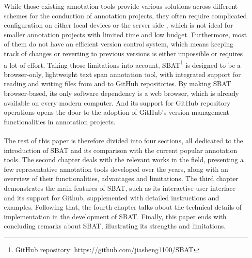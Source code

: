 \documentclass[12ptm a4paper]{article}
\begin{document}
While those existing annotation tools provide various solutions across different schemes for the conduction of annotation projects, they often require complicated configuration on either local devices or the server side \citep{yang2018yeddalightweightcollaborativetext}, which is not ideal for smaller annotation projects with limited time and low budget. Furthermore, most of them do not have an efficient version control system, which means keeping track of changes or reverting to previous versions is either impossible or requires a lot of effort. Taking those limitations into account, SBAT\footnote{GitHub repository: https://github.com/jiasheng1100/SBAT} is designed to be a browser-only, lightweight text span annotation tool, with integrated support for reading and writing files from and to GitHub repositories. By making SBAT browser-based, its only software dependency is a web browser, which is already available on every modern computer. And its support for GitHub repository operations opens the door to the adoption of GitHub's version management functionalities in annotation projects.\\
\\
The rest of this paper is therefore divided into four sections, all dedicated to the introduction of SBAT and its comparison with the current popular annotation tools. The second chapter deals with the relevant works in the field, presenting a few representative annotation tools developed over the years, along with an overview of their functionalities, advantages and limitations. The third chapter demonstrates the main features of SBAT, such as its interactive user interface and its support for Github, supplemented with detailed instructions and examples. Following that, the fourth chapter talks about the technical details of implementation in the development of SBAT. Finally, this paper ends with concluding remarks about SBAT, illustrating its strengths and limitations.


\newpage
\end{document}
